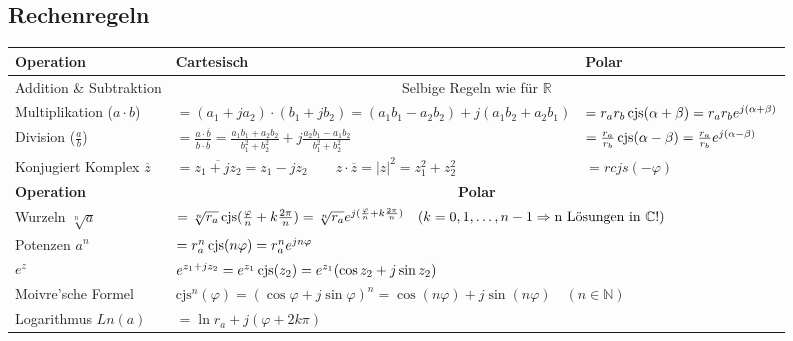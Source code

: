 \subsection{Rechenregeln}
\begin{center}
\begin{tabular}{|l|l|l|}
	\hline
	\textbf{Operation} & \textbf{Cartesisch} & \textbf{Polar} \\
	\hline
	
	Addition \& Subtraktion & 
	\multicolumn{2}{|c|}{Selbige Regeln wie für
	$\mathbb{R}$}\\
	\hline
	
	Multiplikation ($a \cdot b$) &
	$ = (a_1 + j a_2) \cdot (b_1 + j b_2) = (a_1 b_1 - a_2 b_2) + j(a_1 b_2 + a_2
	b_1) $ &
	$ = r_a r_b \operatorname{cjs}(\alpha + \beta) = r_a r_b e^{j(\alpha +
	\beta)}$\\
	\hline 
	
	Division ($\frac{a}{b}$) &
	$ = \frac{a \cdot \overline{b}}{b \cdot \overline{b}}
	  = \frac{a_1 b_1 + a_2 b_2}{b_1^2 + b_2^2} + j \frac{a_2 b_1 - a_1
	  b_2}{b_1^2 + b_2^2}$ & 
	$ = \frac{r_a}{r_b} \operatorname{cjs}(\alpha - \beta) 
	  = \frac{r_a}{r_b} e^{j(\alpha - \beta)}$ \\
	\hline


	Konjugiert Komplex $\overline{z}$ &
		$ = \overline{z_1 + jz_2} = z_1 - jz_2 \qquad
		  z \cdot \overline{z} = |z|^2 = z_1^2 + z_2^2$ &
		  $ = r cjs(-\varphi)$\\
	\hline
	\hline
	
	\textbf{Operation} & \multicolumn{2}{|c|}{
		\textbf{Polar}
	} \\
	
	\hline
	Wurzeln $\sqrt[n]{a}$ &
	\multicolumn{2}{|l|}{
		$ = \sqrt[n]{r_a} \operatorname{cjs}(\frac{\varphi}{n}+k\frac{2\pi}{n}) 
		  = \sqrt[n]{r_a} e^{j(\frac{\varphi}{n} + k \frac{2\pi}{n})} \quad 
		  (k = 0, 1, \ldots, n-1 \Rightarrow \text{n Lösungen in } \mathbb{C} !)
		$
	} \\
	\hline
	
	Potenzen $a^n$ &
	\multicolumn{2}{|l|}{
		$ = r_a^n \operatorname{cjs}(n\varphi) 
		  = r_a^n e^{jn\varphi}
		$
	} \\
	\hline
	
	$e^z$ &
	\multicolumn{2}{|l|}{
		$ e^{z_1+jz_2} 
		  = e^{z_1} \operatorname{cjs}(z_2) 
		  = e^{z_1} (\cos{z_2} + j\sin{z_2})
		$
	} \\
	\hline
	
	Moivre'sche Formel &
	\multicolumn{2}{|l|}{
		$ \text{cjs}^n(\varphi) 
		  = (\cos{\varphi} + j\sin{\varphi})^n 
		  = \cos(n\varphi) +j\sin(n\varphi) \quad (n \in \mathbb{N})
		$
	} \\
	\hline
	
	Logarithmus $Ln(a)$ &
	\multicolumn{2}{|l|}{
		$ = \ln{r_a} + j (\varphi + 2k \pi)$
	} \\
	\hline
\end{tabular}
\end{center}

